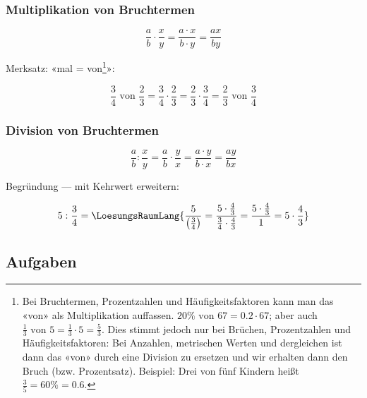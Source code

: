 \newpage




\subsubsection{Multiplikation von Bruchtermen}

\begin{gesetz}{}{}
$$\frac{a}{b}\cdot\frac{x}{y} = \frac{a\cdot x}{b\cdot y} = \frac{ax}{by}$$
\end{gesetz}

Merksatz:
«mal = von\footnote{Bei Bruchtermen, Prozentzahlen und
Häufigkeitsfaktoren kann man das «von» als Multiplikation
auffassen. $20\% \text{ von } 67 = 0.2 \cdot{} 67$; aber auch
$\frac{1}{3} \text{ von } 5
= \frac{1}{3}\cdot{5} = \frac{5}{3}$. Dies stimmt jedoch nur bei
Brüchen, Prozentzahlen und Häufigkeitsfaktoren: Bei Anzahlen,
metrischen Werten und dergleichen ist dann das «von» durch eine
Division zu ersetzen und wir erhalten dann den Bruch
(bzw. Prozentsatz). Beispiel: Drei von fünf Kindern heißt $\frac{3}{5}
= 60\% = 0.6$.}»:

$$\frac34 \text{ von } \frac23 = \frac34\cdot\frac23
=  \frac23\cdot\frac34 = \frac23 \text{ von } \frac34$$


\subsubsection{Division von Bruchtermen}
\begin{gesetz}{}{}
$$\frac{a}{b} : \frac{x}{y}=\frac{a}{b}\cdot\frac{y}{x} = \frac{a\cdot y}{b\cdot x} = \frac{ay}{bx}$$
\end{gesetz}

Begründung — mit Kehrwert erweitern:

$$5 : \frac{3}{4} = \LoesungsRaumLang{
\frac{5}{\left(\frac{3}{4}\right)} =
\frac{5\cdot{}\frac43}{\frac34\cdot{}\frac43} =
\frac{5\cdot{}\frac43}{1} = 5 \cdot{} \frac43}$$
\newpage



\newpage
\subsection*{Aufgaben}
%
%
%


